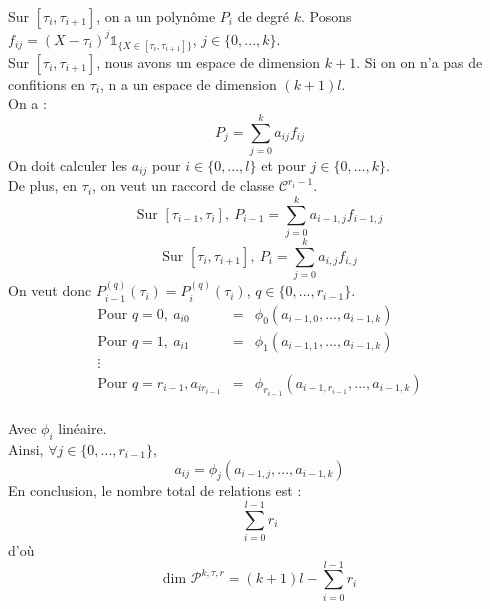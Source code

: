 
\begin{dem}
Sur $[\tau_i,\tau_{i+1}]$, on a un polynôme $P_i$ de degré $k$. Posons $f_{ij}=(X-\tau_i)^j\mathds{1}_{\{X\in[\tau_i, \tau_{i+1}]\}}$, $j\in\{0,...,k\}$.\\
Sur $[\tau_i, \tau_{i+1}]$, nous avons un espace de dimension $k+1$. Si on on n'a pas de confitions en $\tau_i$, n a un espace de dimension $(k+1)l$.\\
On a :
\[P_j=\sum_{j=0}^k a_{ij} f_{ij}\]
On doit calculer les $a_{ij}$ pour $i\in \{0,...,l\}$ et pour $j\in \{0,...,k\}$.\\
De plus, en $\tau_i$, on veut un raccord de classe $\mathcal{C}^{r_i-1}$.\\
\[\text{Sur } [\tau_{i-1}, \tau_i],\ P_{i-1}=\sum_{j=0}^k a_{i-1,j} f_{i-1,j}\]
\[\text{Sur } [\tau_i, \tau_{i+1}],\ P_i=\sum_{j=0}^k a_{i,j} f_{i,j}\]
On veut donc $P_{i-1}^{(q)}(\tau_i)=P_i^{(q)}(\tau_i)$, $q\in\{0,...,r_{i-1}\}$.
\begin{eqnarray*}
\text{Pour } q=0,\ a_{i0}&=&\phi_0(a_{i-1,0},...,a_{i-1,k})\\
\text{Pour } q=1,\ a_{i1}&=&\phi_1(a_{i-1,1},...,a_{i-1,k})\\
\vdots\\
\text{Pour } q=r_{i-1}, a_{ir_{i-1}}&=&\phi_{r_{i-1}}(a_{i-1,r_{i-1}},...,a_{i-1,k})\\
\end{eqnarray*}

Avec $\phi_i$ linéaire.\\
Ainsi, $\forall j\in\{0,...,r_{i-1}\}$, \[a_{ij}=\phi_{j}(a_{i-1,j},...,a_{i-1,k})\]
En conclusion, le nombre total de relations est : \[\sum_{i=0}^{l-1} r_i\]
d'où \[\text{dim } \mathcal{P}^{k,\tau,r}=(k+1)l-\sum_{i=0}^{l-1} r_i\]


\end{dem}
